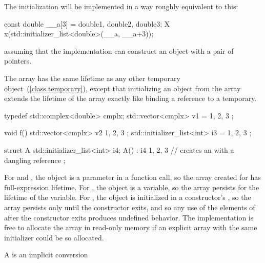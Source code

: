 The initialization will be implemented in a way roughly equivalent to this:

\begin{codeblock}
const double __a[3] = {double{1}, double{2}, double{3}};
X x(std::initializer_list<double>(__a, __a+3));
\end{codeblock}

assuming that the implementation can construct an  object with a pair of pointers. \exitexample

\pnum
The array has the same lifetime as any other temporary
object~(\ref{class.temporary}), except that initializing an
 object from the array extends the lifetime of
the array exactly like binding a reference to a temporary.
\enterexample

\begin{codeblock}
typedef std::complex<double> cmplx;
std::vector<cmplx> v1 = { 1, 2, 3 };

void f() {
  std::vector<cmplx> v2{ 1, 2, 3 };
  std::initializer_list<int> i3 = { 1, 2, 3 };
}

struct A {
  std::initializer_list<int> i4;
  A() : i4{ 1, 2, 3 } {}  // creates an  with a dangling reference
};
\end{codeblock}

For  and , the  object
is a parameter in a function call, so the array created for
 has full-expression lifetime.
For , the  object is a variable,
so the array persists for the lifetime of the variable.
For , the  object is initialized in
a constructor's , so the array persists
only until the constructor exits, and so any use of the elements of
 after the constructor exits produces undefined behavior.
\exitexample
\enternote
The implementation is free to allocate the array in read-only memory if an explicit array with the same initializer could be so allocated. \exitnote

\pnum
A
%
%
 is an implicit conversion

